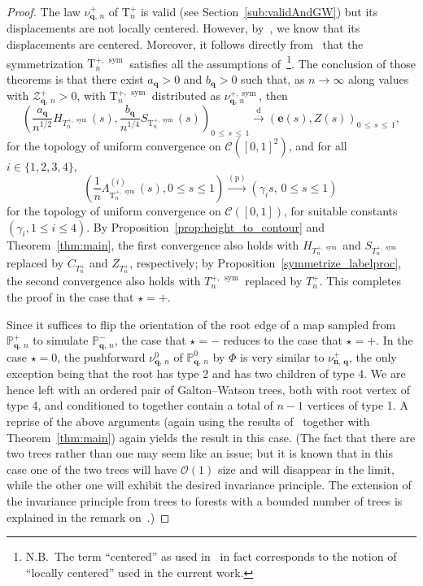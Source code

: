 \documentclass[10pt]{amsart}
\theoremstyle{definition}\newtheorem{defi}[theo]{Definition}\newtheorem{rema}[theo]{Remark}\newtheorem{exam}[theo]{Example}\newtheorem{exem}[theo]{Example}\newtheorem{nota}[theo]{Notation}
\newcommand{\bbP}{\mathbb{P}}
\newcommand{\bfe}{\mathbf{e}}
\newcommand{\bfq}{\mathbf{q}}
\newcommand{\cZ}{\mathcal{Z}}
\newcommand{\cC}{\mathcal{C}}
\newcommand{\cO}{\mathcal{O}}
\newcommand{\rT}{\mathrm{T}}
\DeclareMathOperator{\sym}{sym}
\newcommand{\convdist}{\ensuremath{\stackrel{\mathrm{d}}{\rightarrow}}}
\newcommand{\convpr}{\ensuremath{\stackrel{\mathrm{(p)}}{\longrightarrow}}}
\begin{document}
\begin{proof}
The law $\nu^+_{\bfq,\,n}$ of $\rT_n^+$ is valid (see Section~\ref{sub:validAndGW}) but its displacements are not locally centered. However, by~\cite[Lemma~2]{MiermontInvariance}, we know that its displacements are centered. Moreover, it follows directly from~\cite[Proposition~3]{MiermontInvariance} that the symmetrization $\rT_n^{+,\,\sym}$ satisfies all the assumptions of~\cite[Theorems~2 and~4]{MiermontInvarianceTrees}\footnote{N.B.\ The term ``centered'' as used in~\cite[Theorem~4]{MiermontInvarianceTrees} in fact corresponds to the notion of ``locally centered'' used in the current work.}. The conclusion of those theorems is that there exist $a_{\bfq}>0$ and $b_{\bfq}>0$ such that, as $n \to \infty$ along values with $\cZ_{\bfq,\,n}^+ > 0$, with $\rT_{n}^{+,\,\sym}$ distributed as $\nu^{+,\sym}_{\bfq,\,n}$, then
\[
\left(\frac{a_{\bfq}}{n^{1/2}}H_{T^{+,\,\sym}_n}(s),\frac{b_{\bfq}} {n^{1/4}}S_{\rT^{+,\,\sym}_n}(s)\right)_{0\,\leq\,s\,\leq\,1} \convdist (\bfe (s),Z(s))_{0\,\leq\,s\,\leq\, 1},
\]
for the topology of uniform convergence on $\cC([0,1]^2)$, and for all $i \in \{1,2,3,4\}$,
\[
\left(\frac{1}{n}\Lambda^{(i)}_{\rT^{+,\,\sym}_n}(s),0\leq s\leq 1\right)\convpr \left(\gamma_is,\,0\leq s\leq 1\right)\,
\]
for the topology of uniform convergence on $\cC([0,1])$, for suitable constants $(\gamma_i,1 \le i \le 4)$. By Proposition~\ref{prop:height_to_contour} and Theorem~\ref{thm:main}, the first convergence also holds with $H_{T^{+,\,\sym}_n}$ and $S_{T^{+,\,\sym}_n}$ replaced by $C_{T^{+}_n}$ and $Z_{T^{+}_n}$, respectively; by Proposition~\ref{symmetrize_labelproc}, the second convergence also holds with $T^{+,\,\sym}_n$ replaced by $T^{+}_n$. This completes the proof in the case that $\star=+$.

Since it suffices to flip the orientation of the root edge of a map sampled from $\bbP^+_{\bfq,\,n}$ to simulate $\bbP^-_{\bfq,\,n}$, the case that $\star=-$ reduces to the case that $\star=+$. In the case $\star=0$, the pushforward $\nu^0_{\bfq,\,n}$ of $\bbP^0_{\bfq,\,n}$ by $\Phi$ is very similar to $\nu^+_{\mathbf{n,\,q}}$, the only exception being that the root has type 2 and has two children of type 4. We are hence left with an ordered pair of Galton--Watson trees, both with root vertex of type 4, and conditioned to together contain a total of $n-1$ vertices of type 1. A reprise of the above arguments (again using the results of~\cite{MiermontInvarianceTrees} together with Theorem~\ref{thm:main}) again yields the result in this case. (The fact that there are two trees rather than one may seem like an issue; but it is known that in this case one of the two trees will have $\cO(1)$ size and will disappear in the limit, while the other one will exhibit the desired invariance principle. The extension of the invariance principle from trees to forests with a bounded number of trees is explained in the remark on~\cite[page~1149]{MiermontInvarianceTrees}.)
\end{proof}
\end{document}
